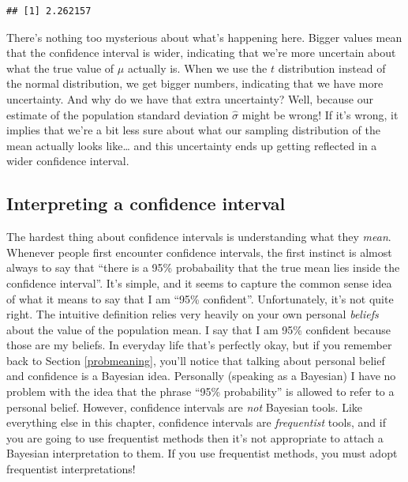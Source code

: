 \documentclass[spanish,]{book}
\begin{document}
\begin{verbatim}
## [1] 2.262157
\end{verbatim}

There's nothing too mysterious about what's happening here. Bigger
values mean that the confidence interval is wider, indicating that we're
more uncertain about what the true value of \(\mu\) actually is. When we
use the \(t\) distribution instead of the normal distribution, we get
bigger numbers, indicating that we have more uncertainty. And why do we
have that extra uncertainty? Well, because our estimate of the
population standard deviation \(\hat\sigma\) might be wrong! If it's
wrong, it implies that we're a bit less sure about what our sampling
distribution of the mean actually looks like\ldots{} and this
uncertainty ends up getting reflected in a wider confidence interval.

\subsection{Interpreting a confidence
interval}\label{interpreting-a-confidence-interval}

The hardest thing about confidence intervals is understanding what they
\emph{mean}. Whenever people first encounter confidence intervals, the
first instinct is almost always to say that ``there is a 95\%
probabaility that the true mean lies inside the confidence interval''.
It's simple, and it seems to capture the common sense idea of what it
means to say that I am ``95\% confident''. Unfortunately, it's not quite
right. The intuitive definition relies very heavily on your own personal
\emph{beliefs} about the value of the population mean. I say that I am
95\% confident because those are my beliefs. In everyday life that's
perfectly okay, but if you remember back to Section \ref{probmeaning},
you'll notice that talking about personal belief and confidence is a
Bayesian idea. Personally (speaking as a Bayesian) I have no problem
with the idea that the phrase ``95\% probability'' is allowed to refer
to a personal belief. However, confidence intervals are \emph{not}
Bayesian tools. Like everything else in this chapter, confidence
intervals are \emph{frequentist} tools, and if you are going to use
frequentist methods then it's not appropriate to attach a Bayesian
interpretation to them. If you use frequentist methods, you must adopt
frequentist interpretations!
\end{document}
